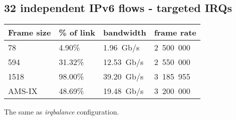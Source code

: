 
\subsection{32 independent IPv6 flows - targeted IRQs}
\begin{tabular}{ | l | l | l | l | }
\hline
Frame size & \% of link & bandwidth & frame rate \\
\hline
78     &  4.90\% &  1.96~Gb/s & 2~500~000 \\
594    & 31.32\% & 12.53~Gb/s & 2~550~000 \\
1518   & 98.00\% & 39.20~Gb/s & 3~185~955 \\
AMS-IX & 48.69\% & 19.48~Gb/s & 3~200~000 \\
\hline
\end{tabular}

The same as {\it{irqbalance}} configuration.

